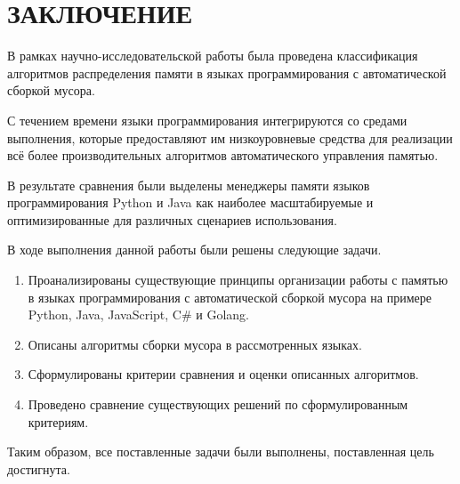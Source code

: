 \part*{ЗАКЛЮЧЕНИЕ}

В рамках научно-исследовательской работы была проведена классификация алгоритмов распределения памяти в языках программирования с автоматической сборкой мусора.

С течением времени языки программирования интегрируются со средами выполнения, которые предоставляют им низкоуровневые средства для реализации всё более производительных алгоритмов автоматического управления памятью.

В результате сравнения были выделены менеджеры памяти языков программирования Python и Java как наиболее масштабируемые и оптимизированные для различных сценариев использования.

В ходе выполнения данной работы были решены следующие задачи.

\begin{enumerate}[label*=\arabic*.]
	\item Проанализированы существующие принципы организации работы с памятью в языках программирования с автоматической сборкой мусора на примере Python, Java, JavaScript, C\# и Golang.
	\item Описаны алгоритмы сборки мусора в рассмотренных языках.
	\item Сформулированы критерии сравнения и оценки описанных алгоритмов.
	\item Проведено сравнение существующих решений по сформулированным критериям. 
\end{enumerate}

Таким образом, все поставленные задачи были выполнены, поставленная цель достигнута.

